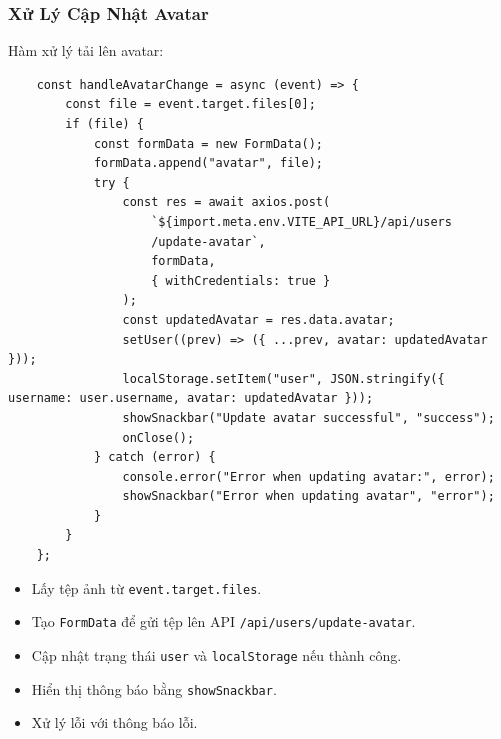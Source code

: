             \subsubsection{Xử Lý Cập Nhật Avatar}
                \hspace*{0.6cm}Hàm xử lý tải lên avatar:
                \begin{lstlisting}
    const handleAvatarChange = async (event) => {
        const file = event.target.files[0];
        if (file) {
            const formData = new FormData();
            formData.append("avatar", file);
            try {
                const res = await axios.post(
                    `${import.meta.env.VITE_API_URL}/api/users
                    /update-avatar`,
                    formData,
                    { withCredentials: true }
                );
                const updatedAvatar = res.data.avatar;
                setUser((prev) => ({ ...prev, avatar: updatedAvatar }));
                localStorage.setItem("user", JSON.stringify({ username: user.username, avatar: updatedAvatar }));
                showSnackbar("Update avatar successful", "success");
                onClose();
            } catch (error) {
                console.error("Error when updating avatar:", error);
                showSnackbar("Error when updating avatar", "error");
            }
        }
    };
                \end{lstlisting}
                \begin{itemize}
                    \item Lấy tệp ảnh từ \texttt{event.target.files}.
                    \item Tạo \texttt{FormData} để gửi tệp lên API \texttt{/api/users/update-avatar}.
                    \item Cập nhật trạng thái \texttt{user} và \texttt{localStorage} nếu thành công.
                    \item Hiển thị thông báo bằng \texttt{showSnackbar}.
                    \item Xử lý lỗi với thông báo lỗi.
                \end{itemize}

